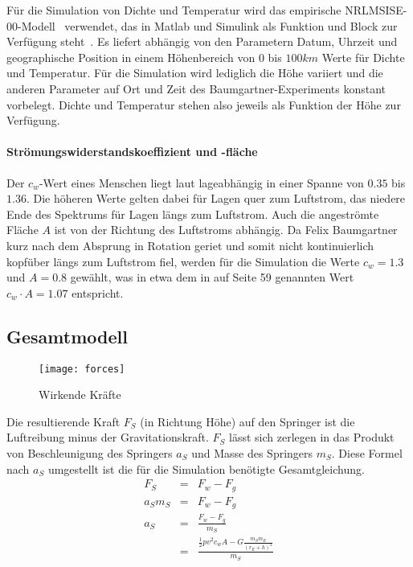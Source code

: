 Für die Simulation von Dichte und Temperatur wird das empirische NRLMSISE-00-Modell~\cite{nrlmsise00:goddardspaceflightcenter} verwendet, das in Matlab und Simulink als Funktion und Block zur Verfügung steht~\cite{matlab:mrlmsise-00}.
Es liefert abhängig von den Parametern Datum, Uhrzeit und geographische Position in einem Höhenbereich von $0$ bis $100km$ Werte für Dichte und Temperatur.
Für die Simulation wird lediglich die Höhe variiert und die anderen Parameter auf Ort und Zeit des Baumgartner-Experiments konstant vorbelegt.
Dichte und Temperatur stehen also jeweils als Funktion der Höhe zur Verfügung.

\paragraph{Strömungswiderstandskoeffizient und -fläche}
Der $c_w$-Wert eines Menschen liegt laut \cite[88]{humankinetics} lageabhängig in einer Spanne von $0.35$ bis $1.36$.
Die höheren Werte gelten dabei für Lagen quer zum Luftstrom, das niedere Ende des Spektrums für Lagen längs zum Luftstrom.
Auch die angeströmte Fläche $A$ ist von der Richtung des Luftstroms abhängig.
Da Felix Baumgartner kurz nach dem Absprung in Rotation geriet und somit nicht kontinuierlich kopfüber längs zum Luftstrom fiel, werden für die Simulation die Werte $c_w=1.3$ und $A=0.8$ gewählt, was in etwa dem in \cite{redbulletin:stratosspecialde} auf Seite 59 genannten Wert $c_w\cdot A=1.07$ entspricht.

\subsection{Gesamtmodell}

\begin{figure}[h]
  \centering
  \texttt{[image: forces]}
  \caption{Wirkende Kräfte}
  \label{fig:forces}
\end{figure}
Die resultierende Kraft $F_S$ (in Richtung Höhe) auf den Springer ist die Luftreibung minus der Gravitationskraft.
$F_S$ lässt sich zerlegen in das Produkt von Beschleunigung des Springers $a_S$ und Masse des Springers $m_S$.
Diese Formel nach $a_S$ umgestellt ist die für die Simulation benötigte Gesamtgleichung.
\begin{eqnarray}
  F_S &=& F_w-F_g \\
  a_Sm_S &=& F_w-F_g \nonumber \\
  a_S &=& \frac{F_w-F_g}{m_S} \label{f:a_s}\\
   &=& \frac{\frac{1}{2}pv^2c_wA-G\frac{m_Sm_E}{(r_E+h)^2}}{m_S} \nonumber
\end{eqnarray}



